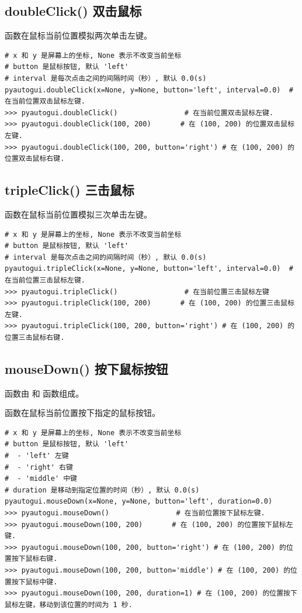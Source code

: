 \subsection{doubleClick() 双击鼠标}
 函数在鼠标当前位置模拟两次单击左键。
\begin{lstlisting}[style=demostyle,numbers=none]
# x 和 y 是屏幕上的坐标, None 表示不改变当前坐标
# button 是鼠标按钮, 默认 'left'
# interval 是每次点击之间的间隔时间（秒）, 默认 0.0(s)
pyautogui.doubleClick(x=None, y=None, button='left', interval=0.0)  # 在当前位置双击鼠标左键.
>>> pyautogui.doubleClick()                # 在当前位置双击鼠标左键.
>>> pyautogui.doubleClick(100, 200)       # 在 (100, 200) 的位置双击鼠标左键.
>>> pyautogui.doubleClick(100, 200, button='right') # 在 (100, 200) 的位置双击鼠标右键. 
\end{lstlisting}

\subsection{tripleClick() 三击鼠标}
 函数在鼠标当前位置模拟三次单击左键。
\begin{lstlisting}[style=demostyle,numbers=none]
# x 和 y 是屏幕上的坐标, None 表示不改变当前坐标
# button 是鼠标按钮, 默认 'left'
# interval 是每次点击之间的间隔时间（秒）, 默认 0.0(s)
pyautogui.tripleClick(x=None, y=None, button='left', interval=0.0)  # 在当前位置三击鼠标左键.
>>> pyautogui.tripleClick()                # 在当前位置三击鼠标左键
>>> pyautogui.tripleClick(100, 200)       # 在 (100, 200) 的位置三击鼠标左键.
>>> pyautogui.tripleClick(100, 200, button='right') # 在 (100, 200) 的位置三击鼠标右键.
\end{lstlisting}


\subsection{mouseDown() 按下鼠标按钮}
 函数由  和  函数组成。

 函数在鼠标当前位置按下指定的鼠标按钮。
\begin{lstlisting}[style=demostyle,numbers=none]
# x 和 y 是屏幕上的坐标, None 表示不改变当前坐标
# button 是鼠标按钮, 默认 'left'
#  - 'left' 左键
#  - 'right' 右键
#  - 'middle' 中键
# duration 是移动到指定位置的时间（秒）, 默认 0.0(s)
pyautogui.mouseDown(x=None, y=None, button='left', duration=0.0)
>>> pyautogui.mouseDown()                # 在当前位置按下鼠标左键.
>>> pyautogui.mouseDown(100, 200)       # 在 (100, 200) 的位置按下鼠标左键.
>>> pyautogui.mouseDown(100, 200, button='right') # 在 (100, 200) 的位置按下鼠标右键.
>>> pyautogui.mouseDown(100, 200, button='middle') # 在 (100, 200) 的位置按下鼠标中键.
>>> pyautogui.mouseDown(100, 200, duration=1) # 在 (100, 200) 的位置按下鼠标左键，移动到该位置的时间为 1 秒.
\end{lstlisting}

